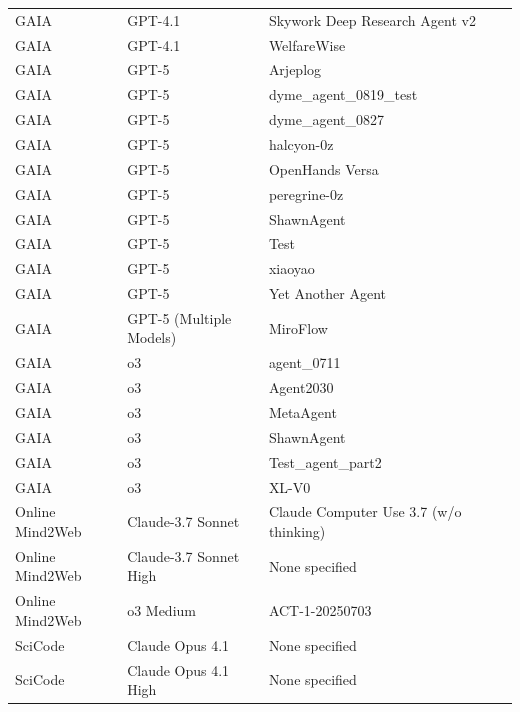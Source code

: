 \begin{longtable}{p{2cm}p{3cm}p{5cm}p{3cm}}
  GAIA & GPT-4.1 & Skywork Deep Research Agent v2 & \cite{mialon_gaia_2023,zhang_agentorchestra_2025} \\
  GAIA & GPT-4.1 & WelfareWise & \cite{mialon_gaia_2023,noauthor_introducing_2025} \\
  GAIA & GPT-5 & Arjeplog & \cite{mialon_gaia_2023} \\
  GAIA & GPT-5 & dyme\_agent\_0819\_test & \cite{mialon_gaia_2023} \\
  GAIA & GPT-5 & dyme\_agent\_0827 & \cite{mialon_gaia_2023} \\
  GAIA & GPT-5 & halcyon-0z & \cite{mialon_gaia_2023} \\
  GAIA & GPT-5 & OpenHands Versa & \cite{mialon_gaia_2023} \\
  GAIA & GPT-5 & peregrine-0z & \cite{mialon_gaia_2023} \\
  GAIA & GPT-5 & ShawnAgent & \cite{mialon_gaia_2023} \\
  GAIA & GPT-5 & Test & \cite{mialon_gaia_2023} \\
  GAIA & GPT-5 & xiaoyao & \cite{mialon_gaia_2023} \\
  GAIA & GPT-5 & Yet Another Agent & \cite{mialon_gaia_2023} \\
  GAIA & GPT-5 (Multiple Models) & MiroFlow & \cite{mialon_gaia_2023,team_miroflow_2025} \\
  GAIA & o3 & agent\_0711 & \cite{mialon_gaia_2023} \\
  GAIA & o3 & Agent2030 & \cite{mialon_gaia_2023} \\
  GAIA & o3 & MetaAgent & \cite{mialon_gaia_2023} \\
  GAIA & o3 & ShawnAgent & \cite{mialon_gaia_2023} \\
  GAIA & o3 & Test\_agent\_part2 & \cite{mialon_gaia_2023} \\
  GAIA & o3 & XL-V0 & \cite{mialon_gaia_2023} \\
  Online Mind2Web & Claude-3.7 Sonnet & Claude Computer Use 3.7 (w/o thinking) & \cite{xue_illusion_2025, deng_mind2web_2023} \\
  Online Mind2Web & Claude-3.7 Sonnet High & None specified & \cite{xue_illusion_2025, deng_mind2web_2023, guo_seed15-vl_2025} \\
  Online Mind2Web & o3 Medium & ACT-1-20250703 & \cite{xue_illusion_2025, deng_mind2web_2023, noauthor_enhans_2025} \\
  SciCode & Claude Opus 4.1 & None specified & \cite{noauthor_artificial_2025} \\
  SciCode & Claude Opus 4.1 High & None specified & \cite{noauthor_artificial_2025} \\

\end{longtable}
